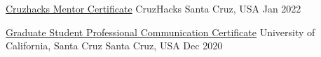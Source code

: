 



\begin{cvhonors}

  \cvhonor
    {\href{https://drive.google.com/file/d/1kkuhZshzdEiIgcwvlWEpmlF8dU1YwG6I/view?usp=sharing}{Cruzhacks Mentor Certificate}} %
    {CruzHacks} %
    {Santa Cruz, USA} %
    {Jan 2022} %

  \cvhonor
    {\href{https://drive.google.com/file/d/1wAr-5Nau_k7tt1DnsJT6V9rUzVNyZJq7/view?usp=sharing}{Graduate Student Professional Communication Certificate}} %
    {University of California, Santa Cruz} %
    {Santa Cruz, USA} %
    {Dec 2020} %

\end{cvhonors}
